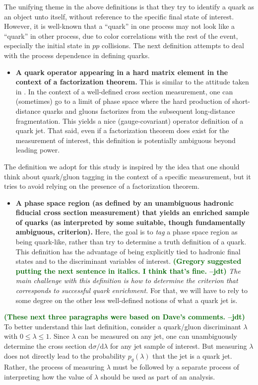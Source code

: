 \documentclass[11pt]{cernrep}
\newcommand{\jdt}[1]{\textbf{\textcolor{darkgreen}{(#1 --jdt)}}}
\begin{document}
The unifying theme in the above definitions is that they try to identify a quark as an object unto itself, without reference to the specific final state of interest.  However, it is well-known that a ``quark'' in one process may not look like a ``quark'' in other process, due to color correlations with the rest of the event, especially the initial state in $pp$ collisions.  The next definition attempts to deal with the process dependence in defining quarks. 
\begin{itemize}
\item \textbf{A quark operator appearing in a hard matrix element in the context of a factorization theorem.}  This is similar to the attitude taken in \cite{Gallicchio:2011xc}.  In the context of a well-defined cross section measurement, one can (sometimes) go to a limit of phase space where the hard production of short-distance quarks and gluons factorizes from the subsequent long-distance fragmentation.  This yields a nice (gauge-covariant) operator definition of a quark jet.  That said, even if a factorization theorem does exist for the measurement of interest, this definition is potentially ambiguous beyond leading power.
\end{itemize}
The definition we adopt for this study is inspired by the idea that one should think about quark/gluon tagging in the context of a specific measurement, but it tries to avoid relying on the presence of a factorization theorem.
\begin{itemize}
\item \textbf{A phase space region (as defined by an unambiguous
    hadronic fiducial cross section measurement) that yields an
    enriched sample of quarks (as interpreted by some suitable, though
    fundamentally ambiguous, criterion).}  Here, the goal is to
  \emph{tag} a phase space region as being quark-like, rather than try
  to determine a truth definition of a quark.  This definition has the
  advantage of being explicitly tied to hadronic final states and to
  the discriminant variables of interest.  \jdt{Gregory suggested putting the next sentence in italics.  I think that's fine.}  \emph{The main
  challenge with this definition is how to determine the criterion
  that corresponds to successful quark enrichment.}  For that, we will
  have to rely to some degree on the other less well-defined notions
  of what a quark jet is.
\end{itemize}

\jdt{These next three paragraphs were based on Dave's comments.}
To better understand this last definition, consider a quark/gluon discriminant $\lambda$ with $0 \le \lambda \le 1$.  Since $\lambda$ can be measured on any jet, one can unambiguously determine the cross section $\text{d} \sigma / \text{d} \lambda$ for any jet sample of interest.  But measuring $\lambda$ does not directly lead to the probability $p_q(\lambda)$ that the jet is a quark jet.  Rather, the process of measuring $\lambda$ must be followed by a separate process of interpreting how the value of $\lambda$ should be used as part of an analysis.
\end{document}
